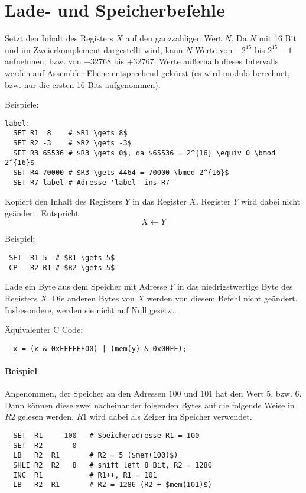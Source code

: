 \section{Lade- und Speicherbefehle}
\label{sec:Lade-Speicher-Instruktionen}

Setzt den Inhalt des Registers $X$ auf den ganzzahligen Wert $N$.
Da $N$ mit 16 Bit und im Zweierkomplement dargestellt wird, kann $N$ Werte von
$-2^{15}$ bis $2^{15} - 1$ aufnehmen, bzw. von $-32768$ bis $+32767$.
Werte außerhalb dieses Intervalls werden auf Assembler-Ebene entsprechend
gekürzt (es wird modulo berechnet, bzw. nur die ersten 16 Bits aufgenommen).

Beispiele:
\begin{lstlisting}
label:
  SET R1  8    # $R1 \gets 8$
  SET R2 -3    # $R2 \gets -3$
  SET R3 65536 # $R3 \gets 0$, da $65536 = 2^{16} \equiv 0 \bmod 2^{16}$
  SET R4 70000 # $R3 \gets 4464 = 70000 \bmod 2^{16}$
  SET R7 label # Adresse 'label' ins R7
\end{lstlisting}


Kopiert den Inhalt des Registers $Y$ in das Register $X$. Register $Y$ wird
dabei nicht geändert. Entspricht
\[
    X \gets Y
\]

Beispiel:
\begin{lstlisting}
 SET  R1 5  # $R1 \gets 5$
 CP   R2 R1 # $R2 \gets 5$
\end{lstlisting}



Lade ein Byte aus dem Speicher mit Adresse $Y$ in das niedrigstwertige
Byte des Registers $X$. Die anderen Bytes von $X$ werden von diesem Befehl nicht
geändert. Insbesondere, werden sie nicht auf Null gesetzt.

Äquivalenter C Code:
\begin{lstlisting}
  x = (x & 0xFFFFFF00) | (mem(y) & 0x00FF);
\end{lstlisting}

\paragraph{Beispiel}
Angenommen, der Speicher an den Adressen $100$ und $101$ hat den Wert $5$, bzw.
$6$. Dann können diese zwei nacheinander folgenden Bytes auf die
folgende Weise in $R2$ gelesen werden. $R1$ wird dabei als Zeiger im Speicher
verwendet.
\begin{lstlisting}
  SET  R1     100   # Speicheradresse R1 = 100
  SET  R2       0
  LB   R2  R1       # R2 = 5 ($mem(100)$)
  SHLI R2  R2   8   # shift left 8 Bit, R2 = 1280
  INC  R1           # R1++, R1 = 101
  LB   R2  R1       # R2 = 1286 (R2 + $mem(101)$)
\end{lstlisting}




